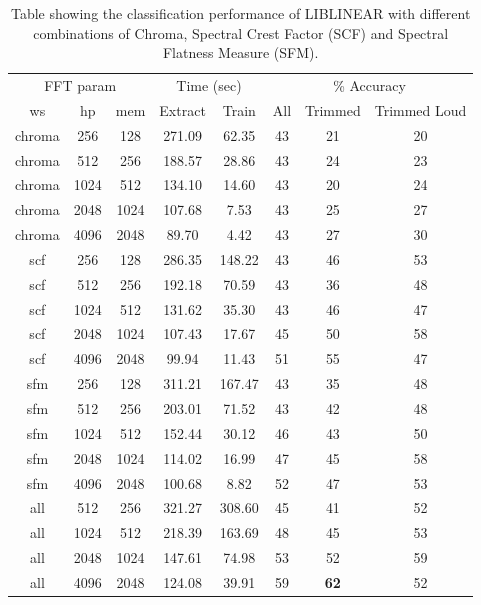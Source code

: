 \begin{table}
\begin{tabular}{|c|c|c|c|c|c|c|c|}
\hline
\multicolumn{3}{|c|}{FFT param} & \multicolumn{2}{c|}{Time (sec)} & \multicolumn{3}{c|}{\% Accuracy} \\
\hhline{|-|-|-|-|-|-|-|-|}
ws & hp & mem & Extract & Train & All & Trimmed & Trimmed Loud \\
\hhline{|=|=|=|=|=|=|=|=|}
chroma & 256 & 128    &   271.09  &   62.35  &  43  & 21 & 20 \\
chroma & 512 & 256    &   188.57  &   28.86  &  43  & 24 & 23 \\
chroma & 1024 & 512   &   134.10  &   14.60  &  43  & 20 & 24 \\
chroma & 2048 & 1024  &   107.68  &    7.53  &  43  & 25 & 27 \\
chroma & 4096 & 2048  &    89.70  &    4.42  &  43  & 27 & 30 \\
\hline
scf & 256 & 128       &   286.35  &  148.22  &  43  & 46 & 53 \\
scf & 512 & 256       &   192.18  &   70.59  &  43  & 36 & 48 \\
scf & 1024 & 512      &   131.62  &   35.30  &  43  & 46 & 47 \\
scf & 2048 & 1024     &   107.43  &   17.67  &  45  & 50 & 58 \\
scf & 4096 & 2048     &    99.94  &   11.43  &  51  & 55 & 47 \\
\hline
sfm & 256 & 128       &   311.21  &  167.47  &  43  & 35 & 48 \\
sfm & 512 & 256       &   203.01  &   71.52  &  43  & 42 & 48 \\
sfm & 1024 & 512      &   152.44  &   30.12  &  46  & 43 & 50 \\
sfm & 2048 & 1024     &   114.02  &   16.99  &  47  & 45 & 58 \\
sfm & 4096 & 2048     &   100.68  &    8.82  &  52  & 47 & 53 \\
\hline
all & 512 & 256       &   321.27  &  308.60  &  45  & 41 & 52 \\
all & 1024 & 512      &   218.39  &  163.69  &  48  & 45 & 53 \\
all & 2048 & 1024     &   147.61  &   74.98  &  53  & 52 & 59 \\
all & 4096 & 2048     &   124.08  &   39.91  &  59  & \textbf{62} & 52 \\
\hline
\end{tabular}
\caption{Table showing the classification performance
  of LIBLINEAR with different combinations of Chroma, Spectral Crest
  Factor (SCF) and Spectral Flatness Measure (SFM).}
\label{table:calls-different-chroma}
\end{table}


